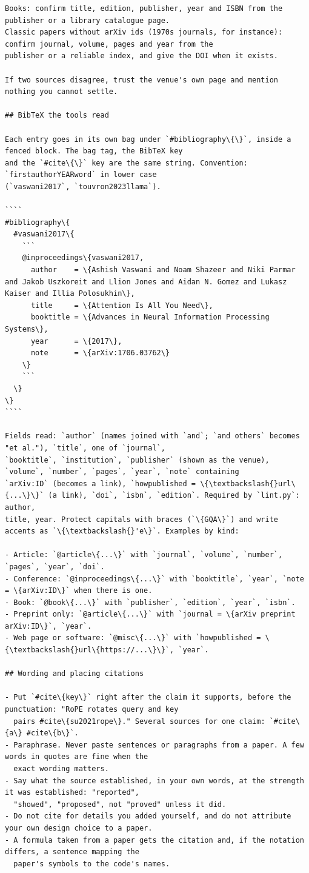 \documentclass[10pt,a4paper]{article}
\begin{document}
\begin{Verbatim}
Books: confirm title, edition, publisher, year and ISBN from the publisher or a library catalogue page.
Classic papers without arXiv ids (1970s journals, for instance): confirm journal, volume, pages and year from the
publisher or a reliable index, and give the DOI when it exists.

If two sources disagree, trust the venue's own page and mention nothing you cannot settle.

## BibTeX the tools read

Each entry goes in its own bag under `#bibliography\{\}`, inside a fenced block. The bag tag, the BibTeX key
and the `#cite\{\}` key are the same string. Convention: `firstauthorYEARword` in lower case
(`vaswani2017`, `touvron2023llama`).

````
#bibliography\{
  #vaswani2017\{
    ```
    @inproceedings\{vaswani2017,
      author    = \{Ashish Vaswani and Noam Shazeer and Niki Parmar and Jakob Uszkoreit and Llion Jones and Aidan N. Gomez and Lukasz Kaiser and Illia Polosukhin\},
      title     = \{Attention Is All You Need\},
      booktitle = \{Advances in Neural Information Processing Systems\},
      year      = \{2017\},
      note      = \{arXiv:1706.03762\}
    \}
    ```
  \}
\}
````

Fields read: `author` (names joined with `and`; `and others` becomes "et al."), `title`, one of `journal`,
`booktitle`, `institution`, `publisher` (shown as the venue), `volume`, `number`, `pages`, `year`, `note` containing
`arXiv:ID` (becomes a link), `howpublished = \{\textbackslash{}url\{...\}\}` (a link), `doi`, `isbn`, `edition`. Required by `lint.py`: author,
title, year. Protect capitals with braces (`\{GQA\}`) and write accents as `\{\textbackslash{}'e\}`. Examples by kind:

- Article: `@article\{...\}` with `journal`, `volume`, `number`, `pages`, `year`, `doi`.
- Conference: `@inproceedings\{...\}` with `booktitle`, `year`, `note = \{arXiv:ID\}` when there is one.
- Book: `@book\{...\}` with `publisher`, `edition`, `year`, `isbn`.
- Preprint only: `@article\{...\}` with `journal = \{arXiv preprint arXiv:ID\}`, `year`.
- Web page or software: `@misc\{...\}` with `howpublished = \{\textbackslash{}url\{https://...\}\}`, `year`.

## Wording and placing citations

- Put `#cite\{key\}` right after the claim it supports, before the punctuation: "RoPE rotates query and key
  pairs #cite\{su2021rope\}." Several sources for one claim: `#cite\{a\} #cite\{b\}`.
- Paraphrase. Never paste sentences or paragraphs from a paper. A few words in quotes are fine when the
  exact wording matters.
- Say what the source established, in your own words, at the strength it was established: "reported",
  "showed", "proposed", not "proved" unless it did.
- Do not cite for details you added yourself, and do not attribute your own design choice to a paper.
- A formula taken from a paper gets the citation and, if the notation differs, a sentence mapping the
  paper's symbols to the code's names.


\end{Verbatim}
\end{document}
